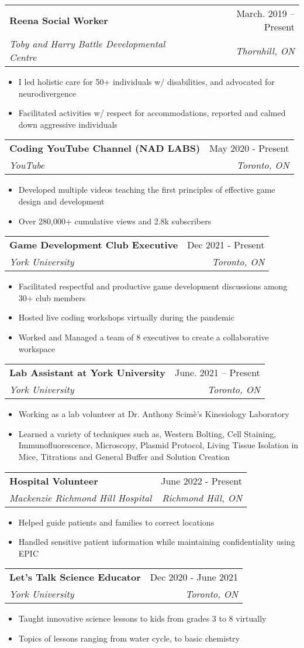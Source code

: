\documentclass[letterpaper,11pt]{article}
\makeatletter
\newcommand{\resumeItem}[1]{
  \item\small{
    {#1 \vspace{-2pt}}
  }
}
\newcommand{\resumeSubheading}[4]{
  \vspace{-2pt}\item
    \begin{tabular*}{0.97\textwidth}[t]{l@{\extracolsep{\fill}}r}
      \textbf{#1} & #2 \\
      \textit{\small#3} & \textit{\small #4} \\
    \end{tabular*}\vspace{-7pt}
}
\newcommand{\resumeItemListStart}{\begin{itemize}}
\newcommand{\resumeItemListEnd}{\end{itemize}\vspace{-5pt}}
\makeatother
\begin{document}
    \resumeSubheading
      {Reena Social Worker}{March. 2019 -- Present}
      {Toby and Harry Battle Developmental Centre}{Thornhill, ON}
      \resumeItemListStart
        \resumeItem{I led holistic care for 50+ individuals w/ disabilities, and advocated for neurodivergence}
        \resumeItem{Facilitated activities w/ respect for accommodations, reported and calmed down aggressive individuals}
    \resumeItemListEnd

    \resumeSubheading
      {Coding YouTube Channel (NAD LABS)}{May 2020 - Present}     
      {YouTube}{Toronto, ON}
      \resumeItemListStart
        \resumeItem{Developed multiple videos teaching the first principles of effective game design and development}
        \resumeItem{Over 280,000+ cumulative views and 2.8k subscribers}
    \resumeItemListEnd

    \resumeSubheading
      {Game Development Club Executive}{Dec 2021 - Present}     
      {York University}{Toronto, ON}
      \resumeItemListStart
        \resumeItem{Facilitated respectful and productive game development discussions among 30+ club members}
        \resumeItem{Hosted live coding workshops virtually during the pandemic}
        \resumeItem{Worked and Managed a team of 8 executives to create a collaborative workspace}
    \resumeItemListEnd
    
    \resumeSubheading
      {Lab Assistant at York University}{June. 2021 -- Present}
      {York University}{Toronto, ON}
      \resumeItemListStart
        \resumeItem{Working as a lab volunteer at Dr. Anthony Scimè's Kinesiology Laboratory}
        \resumeItem{Learned a variety of techniques such as, Western Bolting, Cell Staining, Immunofluorescence, Microscopy, Plasmid Protocol, Living Tissue Isolation in Mice, Titrations and General Buffer and Solution Creation }
    \resumeItemListEnd

    \resumeSubheading
      {Hospital Volunteer}{June 2022 - Present}
      {Mackenzie Richmond Hill Hospital}{Richmond Hill, ON}
      \resumeItemListStart
        \resumeItem{Helped guide patients and families to correct locations}
        \resumeItem{Handled sensitive patient information while maintaining confidentiality using EPIC}
    \resumeItemListEnd

    \resumeSubheading
      {Let's Talk Science Educator}{Dec 2020 - June 2021}     
      {York University}{Toronto, ON}
      \resumeItemListStart
        \resumeItem{Taught innovative science lessons to kids from grades 3 to 8 virtually}
        \resumeItem{Topics of lessons ranging from water cycle, to basic chemistry}
    \resumeItemListEnd        
    
\end{document}

